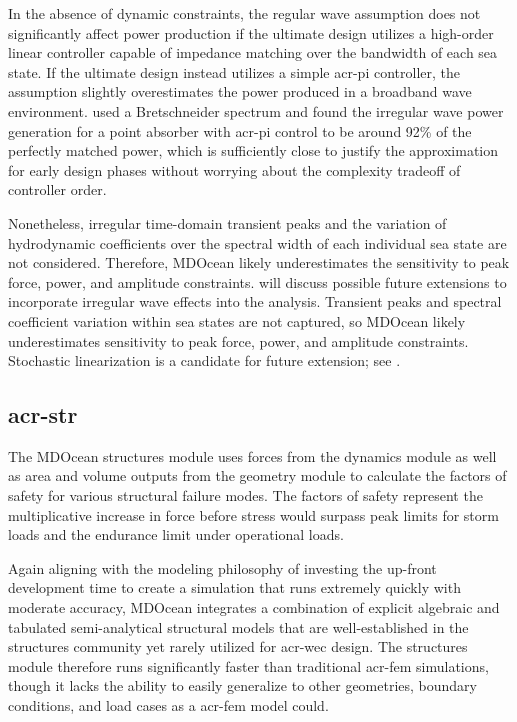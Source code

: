 In the absence of dynamic constraints, the regular wave assumption does not significantly affect power production if the ultimate design utilizes a high-order linear controller capable of impedance matching over the bandwidth of each sea state.
If the ultimate design instead utilizes a simple \gls{acr-pi} controller, the assumption slightly overestimates the power produced in a broadband wave environment.
\citet{coe_practical_2021} used a Bretschneider spectrum and found the irregular wave power generation for a point absorber with \gls{acr-pi} control to be around 92\% of the perfectly matched power, which is sufficiently close to justify the approximation for early design phases without worrying about the complexity tradeoff of controller order.

\ifdefined\DISSERTATION
    Nonetheless, irregular time-domain transient peaks and the variation of hydrodynamic coefficients over the spectral width of each individual sea state are not considered.
    Therefore, MDOcean likely underestimates the sensitivity to peak force, power, and amplitude constraints.
     will discuss possible future extensions to incorporate irregular wave effects into the analysis.
\else
    Transient peaks and spectral coefficient variation within sea states are not captured, so MDOcean likely underestimates sensitivity to peak force, power, and amplitude constraints.
    Stochastic linearization is a candidate for future extension; see .
\fi

\subsection{\gls{acr-str}}\label{sec:structures}
The MDOcean structures module uses forces from the dynamics module as well as area and volume outputs from the geometry module to calculate the factors of safety for various structural failure modes.
The factors of safety represent the multiplicative increase in force before stress would surpass peak limits for storm loads and the endurance limit under operational loads.

\ifdefined\DISSERTATION
    Again aligning with the modeling philosophy of investing the up-front development time to create a simulation that runs extremely quickly with moderate accuracy, MDOcean integrates a combination of explicit algebraic and tabulated semi-analytical structural models that are well-established in the structures community yet rarely utilized for \gls{acr-wec} design.
    The structures module therefore runs significantly faster than traditional \gls{acr-fem} simulations, though it lacks the ability to easily generalize to other geometries, boundary conditions, and load cases as a \gls{acr-fem} model could.

